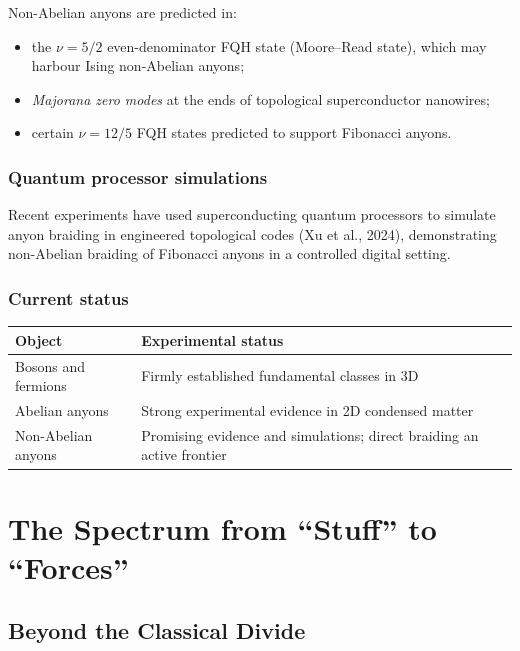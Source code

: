 \documentclass[11pt,a4paper]{article}
\begin{document}
Non-Abelian anyons are predicted in:
\begin{itemize}
  \item the $\nu = 5/2$ even-denominator FQH state (Moore--Read state),
        which may harbour Ising non-Abelian anyons;
  \item \emph{Majorana zero modes} at the ends of topological superconductor
        nanowires;
  \item certain $\nu = 12/5$ FQH states predicted to support Fibonacci anyons.
\end{itemize}

\subsubsection{Quantum processor simulations}

Recent experiments have used superconducting quantum processors to simulate
anyon braiding in engineered topological codes (Xu et al., 2024), demonstrating
non-Abelian braiding of Fibonacci anyons in a controlled digital setting.

\subsubsection{Current status}

\begin{center}
\renewcommand{\arraystretch}{1.3}
\begin{tabular}{ll}
  \toprule
  Object & Experimental status \\
  \midrule
  Bosons and fermions   & Firmly established fundamental classes in 3D \\
  Abelian anyons        & Strong experimental evidence in 2D condensed matter \\
  Non-Abelian anyons    & Promising evidence and simulations; direct braiding an active frontier \\
  \bottomrule
\end{tabular}
\end{center}

\section{The Spectrum from ``Stuff'' to ``Forces''}

\subsection{Beyond the Classical Divide}
\end{document}

